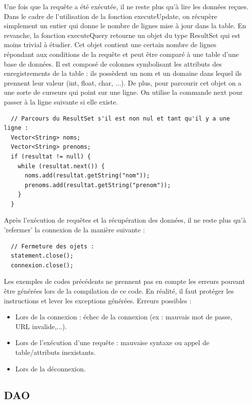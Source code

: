 Une fois que la requête a été exécutée, il ne reste plus qu'à lire les données reçues. Dans le cadre de l'utilisation de la fonction executeUpdate, on récupère
simplement un entier qui donne le nombre de lignes mise à jour dans la table. En revanche, la fonction executeQuery retourne un objet du type ResultSet qui
est moins trivial à étudier. Cet objet contient une certain nombre de lignes répondant aux conditions de la requête et peut être comparé à une table d'une base de données.
Il est composé de colonnes symbolisant les attributs des enregistrements de la table : ils possèdent un nom et un domaine dans lequel ils prennent leur valeur (int, float, char, ...).
De plus, pour parcourir cet objet on a une sorte de curseurs qui point sur une ligne. On utilise la commande next pour passer à la ligne suivante si elle existe.

\begin{lstlisting}  
  // Parcours du ResultSet s'il est non nul et tant qu'il y a une ligne :
  Vector<String> noms;
  Vector<String> prenoms;
  if (resultat != null) {
    while (resultat.next()) {
      noms.add(resultat.getString("nom"));
      prenoms.add(resultat.getString("prenom"));
    }
  }
\end{lstlisting}


Après l'exécution de requêtes et la récupération des données, il ne reste plus qu'à 'refermer' la connexion de la manière suivante :
\begin{lstlisting}
  // Fermeture des ojets :
  statement.close();
  connexion.close();
\end{lstlisting}

Les exemples de codes précédents ne prennent pas en compte les erreurs pouvant être générées lors de la compilation de ce code.
En réalité, il faut protéger les instructions et lever les exceptions générées.
Erreurs possibles :
\begin{itemize}
 \item Lors de la connexion : échec de la connexion (ex : mauvais mot de passe, URL invalide,...).
 \item Lors de l'exécution d'une requête : mauvaise syntaxe ou appel de table/attributs inexistants.
 \item Lors de la déconnexion.
\end{itemize}


\subsection{DAO}

